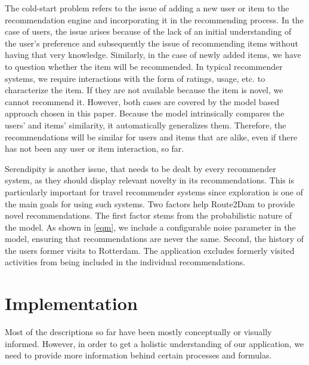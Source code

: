 \documentclass[11pt,a4paper,oneside]{article}
\begin{document}
The cold-start problem refers to the issue of adding a new user or item to the recommendation engine and incorporating it in the recommending process. In the case of users, the issue arises because of the lack of an initial understanding of the user's preference and subsequently the issue of recommending items without having that very knowledge. Similarly, in the case of newly added items, we have to question whether the item will be recommended. In typical recommender systems, we require interactions with the form of ratings, usage, etc. to characterize the item. If they are not available because the item is novel, we cannot recommend it. However, both cases are covered by the model based approach chosen in this paper. Because the model intrinsically compares the users' and items' similarity, it automatically generalizes them. Therefore, the recommendations will be similar for users and items that are alike, even if there has not been any user or item interaction, so far. 

Serendipity is another issue, that needs to be dealt by every recommender system, as they should display relevant novelty in its recommendations. This is particularly important for travel recommender systems since exploration is one of the main goals for using such systems. Two factors help Route2Dam to provide novel recommendations. The first factor stems from the probabilistic nature of the model. As shown in \autoref{eqm}, we include a configurable noise parameter in the model, ensuring that recommendations are never the same. Second, the history of the users former visits to Rotterdam. The application excludes formerly visited activities from being included in the individual recommendations.  


\section{Implementation}
\label{sec:impl}
Most of the descriptions so far have been mostly conceptually or visually informed. However, in order to get a holistic understanding of our application, we need to provide more information behind certain processes and formulas.
\end{document}
